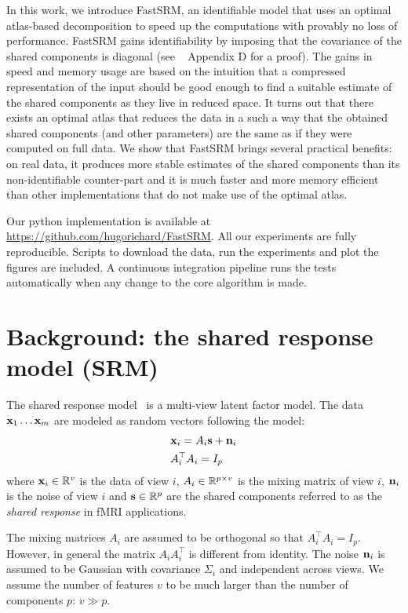 \documentclass{article}
\begin{document}
In this work, we introduce FastSRM, an identifiable model that uses an optimal
atlas-based decomposition to speed up the computations with provably no loss of
performance.
%
FastSRM gains identifiability by imposing that the covariance of the shared
components is diagonal (see ~\cite{richard2020modeling} Appendix D for a proof).
%
The gains in speed and memory usage are based on the intuition that a compressed
representation of the input should be good enough to find a suitable estimate of
the shared components as they live in reduced space.
%
It turns out that there
exists an optimal atlas that reduces the data in a such a way that the obtained
shared components (and other parameters) are the same as if they were computed
on full data.
%
We show that FastSRM brings several practical benefits: on real data, it produces more stable
estimates of the shared components than its non-identifiable counter-part and 
 it is much faster and more memory
efficient than other implementations that do not make use of the optimal atlas.


Our python implementation is available at
\url{https://github.com/hugorichard/FastSRM}.
%
All our experiments are fully reproducible.
%
Scripts to download the data, run the experiments and plot the figures are
included.
%
A continuous integration pipeline runs the tests
automatically when any change to the core algorithm is made.
%


\section{Background: the shared response model (SRM)}
\label{sec:srm:review}
The shared response model~\cite{chen2015reduced} is a multi-view latent factor
model.
%
The data $\mathbf{x}_1 \dots \mathbf{x}_m$ are modeled as random vectors following the model:
\begin{align}
 &\mathbf{x}_i = A_i \mathbf{s} + \mathbf{n}_i \\
  &A_i^{\top}A_i = I_p
  \label{eq:model:srm}
\end{align}
where $\mathbf{x}_i \in \mathbb{R}^v$ is the data of view $i$, $A_i \in \mathbb{R}^{p \times v}$ is the
mixing matrix of view $i$, $\mathbf{n}_i$ is the noise of view $i$ and $\mathbf{s} \in \mathbb{R}^p$ are the
shared components referred to as the \emph{shared response} in fMRI
applications.
%

The mixing matrices
$A_i$ are assumed to be orthogonal so that $A_i^{\top}A_i = I_p$.
%
However, in
general the matrix $A_i A_i^{\top}$ is different from identity.
%
The noise
$\mathbf{n}_i$ is assumed to be Gaussian with covariance $\Sigma_i$ and independent
across views.
%
We assume the number of features $v$ to be much larger than the
number of components $p$: $v \gg p$.
%
\end{document}
